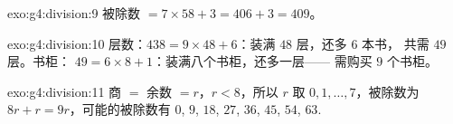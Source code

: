 \begin{solution}{exo:g4:division:9}
被除数 $= 7 \times 58 + 3 = 406 + 3 = 409$。
\end{solution}

\begin{solution}{exo:g4:division:10}
层数：$438 = 9 \times 48 + 6$：装满 $48$ 层，还多 $6$ 本书，
共需 $49$ 层。书柜：
$49 = 6 \times 8 + 1$：装满八个书柜，还多一层——
需购买 $9$ 个书柜。
\end{solution}

\begin{solution}{exo:g4:division:11}
商 $=$ 余数 $= r$，$r < 8$，所以 $r$ 取 $0, 1, \dots,
7$，被除数为 $8r + r = 9r$，可能的被除数有
$0$, $9$, $18$, $27$, $36$, $45$, $54$, $63$.
\end{solution}

